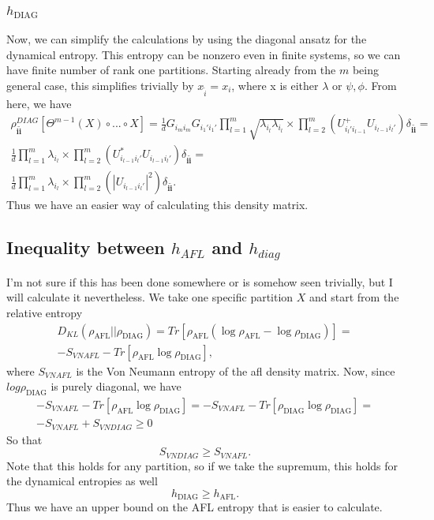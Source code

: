 \documentclass{article}
\newcommand{\afl}{h_{\text{AFL}}}
\newcommand{\diag}{h_{\text{DIAG}}}
\newcommand{\rafl}{\rho_{\text{AFL}}}
\newcommand{\rdiag}{\rho_{\text{DIAG}}}
\begin{document}
\subsubsection{$\diag$}
Now, we can simplify the calculations by using the diagonal ansatz for the dynamical entropy. This entropy can be nonzero even in finite systems, so we can have finite number of rank one partitions. Starting already from the $m$ being general case, this simplifies trivially by $x_{\tilde{i}} = x_i$, where x is either $\lambda$ or $\psi, \phi$. From here, we have
\begin{multline}
\rho_{\mathbf{i}\mathbf{\tilde{i}}}^{DIAG}
[\Theta^{m-1}(X)\circ...\circ X]
=\frac{1}{d}G_{i_mi_m}
G_{i_1'i_1'}
\prod_{l=1}^m{\sqrt{\lambda_{i_l}\lambda_{i_l}}}\times\prod_{l=2}^m{\left(U^+_{i_l'i_{l-1}}U_{i_{l-1}i_l'}\right)}\delta_{\mathbf{i}\mathbf{\tilde{i}}} = \\
\frac{1}{d}
\prod_{l=1}^m{\lambda_{i_l}}\times\prod_{l=2}^m{\left(U^*_{i_{l-1}i_l'}U_{i_{l-1}i_l'}\right)}\delta_{\mathbf{i}\mathbf{\tilde{i}}} = \\
\frac{1}{d}
\prod_{l=1}^m{\lambda_{i_l}}\times\prod_{l=2}^m{\left(|U_{i_{l-1}i_l'}|^2\right)}\delta_{\mathbf{i}\mathbf{\tilde{i}}}.
\end{multline}
Thus we have an easier way of calculating this density matrix.
\subsection{Inequality between $h_{AFL}$ and $h_{diag}$}
I'm not sure if this has been done somewhere or is somehow seen trivially, but I will calculate it nevertheless. We take one specific partition $X$ and start from the relative entropy
\begin{multline}
    D_{KL}(\rafl||\rdiag) = Tr[\rafl(\log\rafl-\log\rdiag)] =\\ -S_{VNAFL} - Tr[\rafl \log\rdiag], 
\end{multline}
where $S_{VNAFL}$ is the Von Neumann entropy of the afl density matrix. Now, since $log\rdiag$ is purely diagonal, we have 
\begin{multline}
    -S_{VNAFL} - Tr[\rafl \log\rdiag] =  
    -S_{VNAFL} - Tr[\rdiag \log\rdiag] = \\
    -S_{VNAFL} + S_{VNDIAG} \geq 0 
\end{multline}
So that 
\begin{equation}
    S_{VNDIAG} \geq S_{VNAFL}. 
\end{equation}
Note that this holds for any partition, so if we take the supremum, this holds for the dynamical entropies as well
\begin{equation}
    \diag \geq \afl.
\end{equation}
Thus we have an upper bound on the AFL entropy that is easier to calculate. 
\end{document}
